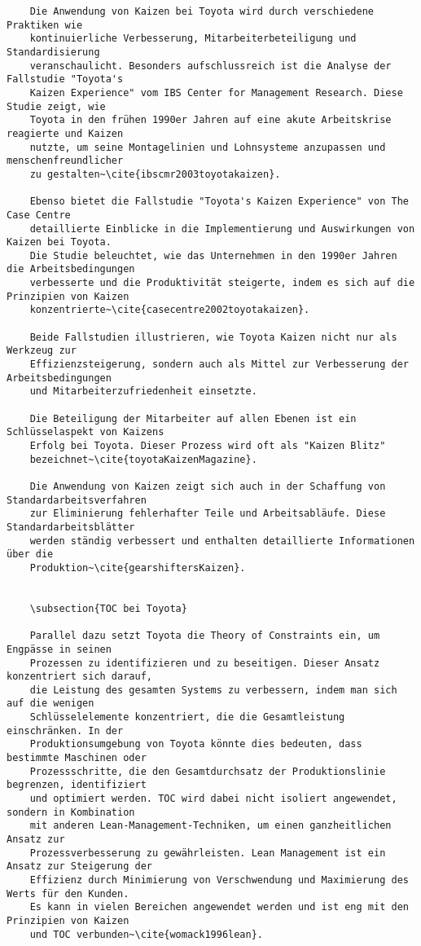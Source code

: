 \begin{verbatim}
	Die Anwendung von Kaizen bei Toyota wird durch verschiedene Praktiken wie
	kontinuierliche Verbesserung, Mitarbeiterbeteiligung und Standardisierung 
	veranschaulicht. Besonders aufschlussreich ist die Analyse der Fallstudie "Toyota's 
	Kaizen Experience" vom IBS Center for Management Research. Diese Studie zeigt, wie 
	Toyota in den frühen 1990er Jahren auf eine akute Arbeitskrise reagierte und Kaizen
	nutzte, um seine Montagelinien und Lohnsysteme anzupassen und menschenfreundlicher 
	zu gestalten~\cite{ibscmr2003toyotakaizen}.
	
	Ebenso bietet die Fallstudie "Toyota's Kaizen Experience" von The Case Centre 
	detaillierte Einblicke in die Implementierung und Auswirkungen von Kaizen bei Toyota.
	Die Studie beleuchtet, wie das Unternehmen in den 1990er Jahren die Arbeitsbedingungen
	verbesserte und die Produktivität steigerte, indem es sich auf die Prinzipien von Kaizen
	konzentrierte~\cite{casecentre2002toyotakaizen}.
	
	Beide Fallstudien illustrieren, wie Toyota Kaizen nicht nur als Werkzeug zur
	Effizienzsteigerung, sondern auch als Mittel zur Verbesserung der Arbeitsbedingungen
	und Mitarbeiterzufriedenheit einsetzte.
	
	Die Beteiligung der Mitarbeiter auf allen Ebenen ist ein Schlüsselaspekt von Kaizens
	Erfolg bei Toyota. Dieser Prozess wird oft als "Kaizen Blitz"
	bezeichnet~\cite{toyotaKaizenMagazine}.
	
	Die Anwendung von Kaizen zeigt sich auch in der Schaffung von Standardarbeitsverfahren
	zur Eliminierung fehlerhafter Teile und Arbeitsabläufe. Diese Standardarbeitsblätter
	werden ständig verbessert und enthalten detaillierte Informationen über die
	Produktion~\cite{gearshiftersKaizen}.
	
	
	\subsection{TOC bei Toyota}
	
	Parallel dazu setzt Toyota die Theory of Constraints ein, um Engpässe in seinen
	Prozessen zu identifizieren und zu beseitigen. Dieser Ansatz konzentriert sich darauf,
	die Leistung des gesamten Systems zu verbessern, indem man sich auf die wenigen
	Schlüsselelemente konzentriert, die die Gesamtleistung einschränken. In der
	Produktionsumgebung von Toyota könnte dies bedeuten, dass bestimmte Maschinen oder
	Prozessschritte, die den Gesamtdurchsatz der Produktionslinie begrenzen, identifiziert
	und optimiert werden. TOC wird dabei nicht isoliert angewendet, sondern in Kombination
	mit anderen Lean-Management-Techniken, um einen ganzheitlichen Ansatz zur
	Prozessverbesserung zu gewährleisten. Lean Management ist ein Ansatz zur Steigerung der
	Effizienz durch Minimierung von Verschwendung und Maximierung des Werts für den Kunden.
	Es kann in vielen Bereichen angewendet werden und ist eng mit den Prinzipien von Kaizen
	und TOC verbunden~\cite{womack1996lean}.
	

\end{verbatim}
